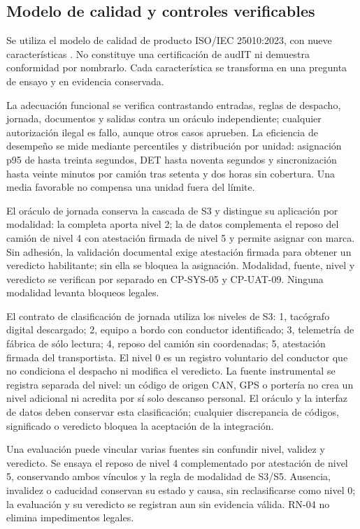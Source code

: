 \subsection{Modelo de calidad y controles verificables}\label{sec:9-modelo}

Se utiliza el modelo de calidad de producto ISO/IEC 25010:2023, con nueve características \parencite{iso25010_2023}. No constituye una certificación de audIT ni demuestra conformidad por nombrarlo. Cada característica se transforma en una pregunta de ensayo y en evidencia conservada.

La adecuación funcional se verifica contrastando entradas, reglas de despacho, jornada, documentos y salidas contra un oráculo independiente; cualquier autorización ilegal es fallo, aunque otros casos aprueben. La eficiencia de desempeño se mide mediante percentiles y distribución por unidad: asignación p95 de hasta treinta segundos, DET hasta noventa segundos y sincronización hasta veinte minutos por camión tras setenta y dos horas sin cobertura. Una media favorable no compensa una unidad fuera del límite.

El oráculo de jornada conserva la cascada de S3 y distingue su aplicación por modalidad: la completa aporta nivel 2; la de datos complementa el reposo del camión de nivel 4 con atestación firmada de nivel 5 y permite asignar con marca. Sin adhesión, la validación documental exige atestación firmada para obtener un veredicto habilitante; sin ella se bloquea la asignación. Modalidad, fuente, nivel y veredicto se verifican por separado en CP-SYS-05 y CP-UAT-09. Ninguna modalidad levanta bloqueos legales.

El contrato de clasificación de jornada utiliza los niveles de S3: 1, tacógrafo digital descargado; 2, equipo a bordo con conductor identificado; 3, telemetría de fábrica de sólo lectura; 4, reposo del camión sin coordenadas; 5, atestación firmada del transportista. El nivel 0 es un registro voluntario del conductor que no condiciona el despacho ni modifica el veredicto. La fuente instrumental se registra separada del nivel: un código de origen CAN, GPS o portería no crea un nivel adicional ni acredita por sí solo descanso personal. El oráculo y la interfaz de datos deben conservar esta clasificación; cualquier discrepancia de códigos, significado o veredicto bloquea la aceptación de la integración.

Una evaluación puede vincular varias fuentes sin confundir nivel, validez y veredicto. Se ensaya el reposo de nivel 4 complementado por atestación de nivel 5, conservando ambos vínculos y la regla de modalidad de S3/S5. Ausencia, invalidez o caducidad conservan su estado y causa, sin reclasificarse como nivel 0; la evaluación y su veredicto se registran aun sin evidencia válida. RN-04 no elimina impedimentos legales.


